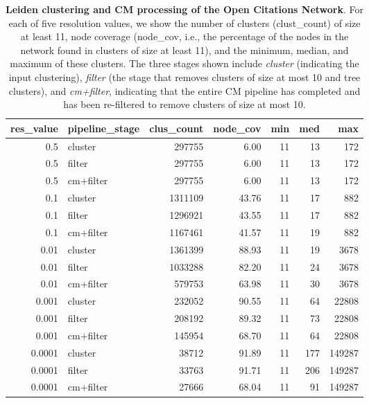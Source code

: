 \documentclass[11pt]{article}   	%
\begin{document}
\begin{table}[ht]
\centering
\begin{tabular}{rlrrrrr}
  \hline
res\_value & pipeline\_stage & clus\_count & node\_cov & min & med & max \\ 
  \hline
0.5 & cluster & 297755 & 6.00 &    11 & 13 &   172 \\ 
 0.5 & filter & 297755 & 6.00&    11 & 13 &   172 \\ 
 0.5 & cm+filter & 297755 & 6.00 &    11 & 13 &   172 \\ 
 \hline
 0.1 & cluster & 1311109 & 43.76 &    11 & 17 &   882 \\ 
 0.1 & filter & 1296921 & 43.55 &    11 & 17 &   882 \\ 
 0.1 & cm+filter & 1167461 & 41.57 &    11 & 19 &   882 \\ 
 \hline
 0.01 & cluster & 1361399 & 88.93 &    11 & 19 &  3678 \\ 
 0.01 & filter & 1033288 & 82.20 &    11 & 24 &  3678 \\ 
 0.01 & cm+filter & 579753 & 63.98 &    11 & 30 &  3678 \\ 
 \hline
 0.001 & cluster & 232052 & 90.55 &    11 & 64 & 22808 \\ 
 0.001 & filter & 208192 & 89.32 &    11 & 73 & 22808 \\ 
 0.001 & cm+filter & 145954 & 68.70 &    11 & 64 & 22808 \\ 
 \hline
 0.0001 & cluster & 38712 & 91.89 &    11 & 177 & 149287 \\ 
 0.0001 & filter & 33763 & 91.71 &    11 & 206 & 149287 \\ 
 0.0001 & cm+filter & 27666 & 68.04 &    11 & 91 & 149287 \\ 
   \hline
\end{tabular}
\caption{\textbf{Leiden clustering and CM processing of the Open Citations Network}. For each of five resolution values, we show  the number of clusters (clust\_count) of size at least 11, node coverage (node\_cov, i.e., the percentage  of the nodes in the network found in clusters of size at least 11), and the minimum, median, and maximum of these clusters. The three stages shown include  \emph{cluster} (indicating the input clustering), \emph{filter} (the stage that removes  clusters of size at most 10 and tree clusters), and  \emph{cm+filter}, indicating that the entire CM pipeline has completed and has been re-filtered to remove clusters of size at most 10.}
\label{tab:Leiden-OC-11}
\end{table}
\end{document}
